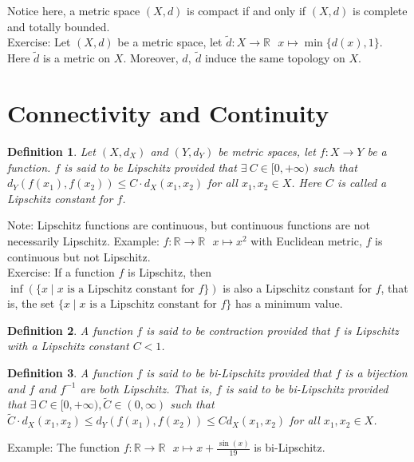 \documentclass[11pt,oneside]{book}
\theoremstyle{break}
\theoremstyle{break}
\newtheorem{defn}{Definition}[corL]
\newcommand{\R}{\mathbb{R}}
\newcommand{\note}{\color{red}Note: \color{black}}
\newcommand{\example}{\color{green}Example: \color{black}}
\newcommand{\exercise}{\color{green}Exercise: \color{black}}
\begin{document}
Notice here, a metric space $(X,d)$ is compact if and only if $(X,d)$ is complete and totally bounded.\\

\exercise Let $(X,d)$ be a metric space, let $\widetilde{d}:X \to \R\ \ \ x\mapsto \min\{ d(x),1\}$.\\ 
Here $\widetilde{d}$ is a metric on $X$. Moreover, $d,\ \widetilde{d}$ induce the same topology on $X$. \\


\newpage
\section[Connectivity and Continuity]{\color{red} Connectivity and Continuity \color{black}}

\begin{defn}
Let $(X,d_X)$ and $(Y,d_Y)$ be metric spaces, let $f:X \to Y$ be a function. $f$ is said to be Lipschitz provided that $\exists\ C \in [0,+\infty)$ such that $d_Y(f(x_1),f(x_2)) \leq C \cdot d_X(x_1,x_2)$ for all $x_1,x_2 \in X$. Here $C$ is called a Lipschitz constant for $f$.
\end{defn}
\note Lipschitz functions are continuous, but continuous functions are not necessarily Lipschitz.
\example $f:\R \to \R\ \ \ x\mapsto x^2$ with Euclidean metric, $f$ is continuous but not Lipschitz.\\
\exercise If a function $f$ is Lipschitz, then $\inf(\{x \mid x\text{ is a Lipschitz constant for }f\})$ is also a Lipschitz constant for $f$, that is, the set $\{x \mid x\text{ is a Lipschitz constant for }f\}$ has a minimum value.\\

\begin{defn}
A function $f$ is said to be contraction provided that $f$ is Lipschitz with a Lipschitz constant $C<1$.
\end{defn}

\begin{defn}
A function $f$ is said to be bi-Lipschitz provided that $f$ is a bijection and $f$ and $f^{-1}$ are both Lipschitz. That is, $f$ is said to be bi-Lipschitz provided that $\exists\ C \in [0,+\infty), \widetilde{C}\in (0,\infty)$ such that $\widetilde{C}\cdot d_X(x_1,x_2) \leq d_Y(f(x_1),f(x_2)) \leq C d_X(x_1,x_2)$ for all $x_1,x_2 \in X$. 
\end{defn}

\example The function $f:\R \to \R \ \ \ x\mapsto x+\frac{\sin(x)}{19}$ is bi-Lipschitz.
\end{document}
